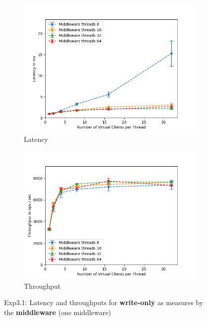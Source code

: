 \documentclass[11pt,a4paper]{article}
\begin{document}
\begin{figure}[H]
\centering
\begin{subfigure}{.5\textwidth}
    \centering
    \includegraphics[width=\textwidth]{img/exp3_1/exp3_1__latency_middleware_write_1.png}
    \caption{Latency}
    \label{fig:mesh1}
\end{subfigure}%
\begin{subfigure}{.5\textwidth}
      \centering
    \includegraphics[width=\textwidth]{img/exp3_1/exp3_1__throughput_middleware_write_1.png}
    \caption{Throughput}
    \label{fig:mesh1}
\end{subfigure}
\caption{Exp3.1: Latency and throughputs for \textbf{write-only} as measures by the \textbf{middleware} (one middleware)}
\label{fig:test}
\end{figure}
\end{document}
